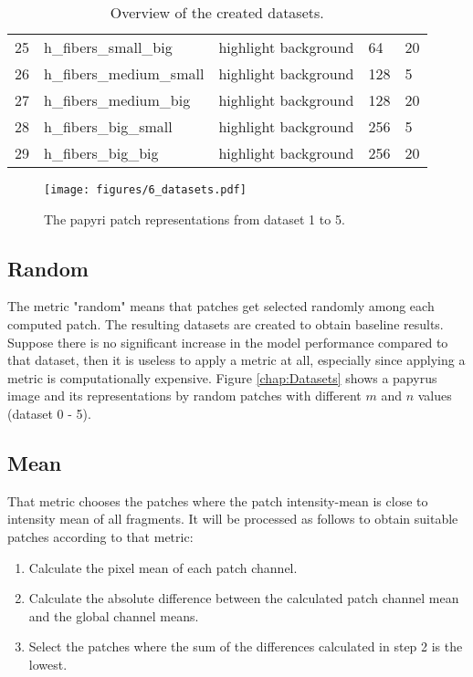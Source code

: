 \begin{table}[]
{\begin{tabular}{lllll}
			25 & h\_fibers\_small\_big & highlight background & 64 & 20 \\
			26 & h\_fibers\_medium\_small & highlight background & 128 & 5 \\
			27 & h\_fibers\_medium\_big & highlight  background & 128 & 20 \\
			28 & h\_fibers\_big\_small & highlight background & 256 & 5 \\
			29 & h\_fibers\_big\_big & highlight  background & 256 & 20 \\ \hline
		\end{tabular}%
	}
	\caption{Overview of the created datasets.}
	\label{tab:datasets}
\end{table}

\begin{figure}[t]
	\label{fig:dataset}
	\texttt{[image: figures/6\_datasets.pdf]}
	\caption{The papyri patch representations from dataset 1 to 5.}
\end{figure}

\subsection{Random}
The metric "random" means that patches get selected randomly among each computed patch. The resulting datasets are created to obtain baseline results. Suppose there is no significant increase in the model performance compared to that dataset, then it is useless to apply a metric at all, especially since applying a metric is computationally expensive. Figure \ref{chap:Datasets} shows a papyrus image and its representations by random patches with different \(m\) and \(n\) values (dataset 0 - 5).

\subsection{Mean}

That metric chooses the patches where the patch intensity-mean is close to intensity mean of all fragments. It will be processed as follows to obtain suitable patches according to that metric:
\begin{enumerate}
	\item Calculate the pixel mean of each patch channel.
	\item Calculate the absolute difference between the calculated patch channel mean and the global channel means.
	\item Select the patches where the sum of the differences calculated in step 2 is the lowest. 
\end{enumerate}

